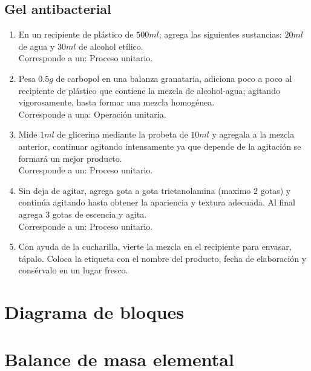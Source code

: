 \documentclass[12pt]{article}
\begin{document}
	\subsection{Gel antibacterial}	
		\begin{enumerate}
			\item En un recipiente de plástico de $500 ml$; agrega las siguientes sustancias: $20 ml$ de agua y $30 ml$ de alcohol etílico.\\
			Corresponde a un: Proceso unitario.			

			\item Pesa $0.5 g$ de carbopol en una balanza granataria, adiciona poco a poco al recipiente de plástico que contiene la mezcla de alcohol-agua; agitando vigorosamente, hasta formar una mezcla homogénea.\\
			Corresponde a una: Operación unitaria.			

			\item Mide $1 ml$ de glicerina mediante la probeta de $10 ml$ y agregala a la mezcla anterior, continuar agitando intensamente ya que depende de la agitación se formará un mejor producto.\\
			Corresponde a un: Proceso unitario.

			\item Sin deja de agitar, agrega gota a gota trietanolamina (maximo 2 gotas) y continúa agitando hasta obtener la apariencia y textura adecuada. Al final agrega 3 gotas de escencia y agita.\\
			Corresponde a un: Proceso unitario.

			\item Con ayuda de la cucharilla, vierte la mezcla en el recipiente para envasar, tápalo. Coloca la etiqueta con el nombre del producto, fecha de elaboración y consérvalo en un lugar fresco.
		\end{enumerate}

\section{Diagrama de bloques}
\section{Balance de masa elemental}
\end{document}
